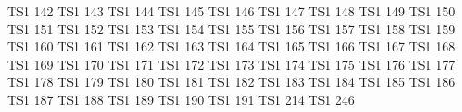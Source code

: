 \exchardef  \exwon                   TS1  142
\exchardef  \exnaira                 TS1  143
\exchardef  \exguarani               TS1  144
\exchardef  \expeso                  TS1  145
\exchardef  \exlira                  TS1  146
\exchardef  \exrecipe                TS1  147
\exchardef  \exinterrobang           TS1  148
\exchardef  \exinterrobangdown       TS1  149
\exchardef  \exdong                  TS1  150
\exchardef  \extrademark             TS1  151
\exchardef  \expertenthousand        TS1  152
\exchardef  \expilcrow               TS1  153
\exchardef  \exbaht                  TS1  154
\exchardef  \exnumero                TS1  155
\exchardef  \exdiscount              TS1  156
\exchardef  \exestimated             TS1  157
\exchardef  \exopenbullet            TS1  158
\exchardef  \exservicemark           TS1  159
\exchardef  \exlquill                TS1  160
\exchardef  \exrquill                TS1  161
\exchardef  \excent                  TS1  162
\exchardef  \exsterling              TS1  163
\exchardef  \excurrency              TS1  164
\exchardef  \exyen                   TS1  165
\exchardef  \exbrokenbar             TS1  166
\exchardef  \exsection               TS1  167
\exchardef  \exasciidieresis         TS1  168
\exchardef  \excopyright             TS1  169
\exchardef  \exordfeminine           TS1  170
\exchardef  \excopyleft              TS1  171
\exchardef  \exlnot                  TS1  172
\exchardef  \excircledP              TS1  173
\exchardef  \exregistered            TS1  174
\exchardef  \exasciimacron           TS1  175
\exchardef  \exdegree                TS1  176
\exchardef  \expm                    TS1  177
\exchardef  \extwosuperior           TS1  178
\exchardef  \exthreesuperior         TS1  179
\exchardef  \exasciiacute            TS1  180
\exchardef  \exmu                    TS1  181
\exchardef  \exparagraph             TS1  182
\exchardef  \experiodcentered        TS1  183
\exchardef  \exreferencemark         TS1  184
\exchardef  \exonesuperior           TS1  185
\exchardef  \exordmasculine          TS1  186
\exchardef  \exsurd                  TS1  187
\exchardef  \exonequarter            TS1  188
\exchardef  \exonehalf               TS1  189
\exchardef  \exthreequarters         TS1  190
\exchardef  \exeuro                  TS1  191
\exchardef  \extimes                 TS1  214
\exchardef  \exdiv                   TS1  246

\endinput

===================================================================================

